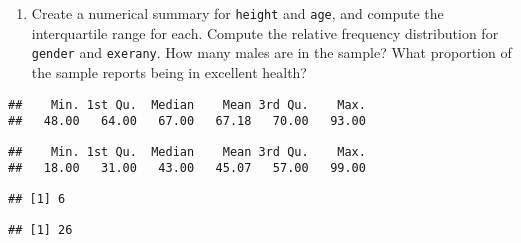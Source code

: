 \documentclass[]{article}
\newenvironment{Shaded}{\begin{snugshade}}{\end{snugshade}}
\newcommand{\KeywordTok}[1]{\textcolor[rgb]{0.13,0.29,0.53}{\textbf{{#1}}}}
\newcommand{\NormalTok}[1]{{#1}}
\begin{document}
\begin{enumerate}
\def\labelenumi{\arabic{enumi}.}
\setcounter{enumi}{1}
\itemsep1pt\parskip0pt
\item
  Create a numerical summary for \texttt{height} and \texttt{age}, and
  compute the interquartile range for each. Compute the relative
  frequency distribution for \texttt{gender} and \texttt{exerany}. How
  many males are in the sample? What proportion of the sample reports
  being in excellent health?
\end{enumerate}

\begin{Shaded}
\end{Shaded}

\begin{verbatim}
##    Min. 1st Qu.  Median    Mean 3rd Qu.    Max. 
##   48.00   64.00   67.00   67.18   70.00   93.00
\end{verbatim}

\begin{Shaded}
\end{Shaded}

\begin{verbatim}
##    Min. 1st Qu.  Median    Mean 3rd Qu.    Max. 
##   18.00   31.00   43.00   45.07   57.00   99.00
\end{verbatim}

\begin{Shaded}
\end{Shaded}

\begin{verbatim}
## [1] 6
\end{verbatim}

\begin{Shaded}
\end{Shaded}

\begin{verbatim}
## [1] 26
\end{verbatim}
\end{document}
